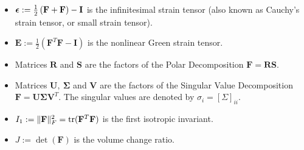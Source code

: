 \begin{itemize}
\item $\hbox{\boldmath $\epsilon$}:=\frac{1}{2}\left(\mathbf{F}+\mathbf{F}\right)-\mathbf{I}$ is
    the infinitesimal strain tensor (also known as Cauchy's strain tensor, or
    small strain tensor).
\item $\mathbf{E}:=\frac{1}{2}\left(\mathbf{F}^T\mathbf{F}-\mathbf{I}\right)$ is
  the nonlinear Green strain tensor.
\item Matrices $\mathbf{R}$ and $\mathbf{S}$ are the factors of the Polar
  Decomposition $\mathbf{F}=\mathbf{RS}$.
\item Matrices $\mathbf{U},\ \mathbf{\Sigma}$ and $\mathbf{V}$ are the factors
  of the Singular Value Decomposition $\mathbf{F}=\mathbf{U\Sigma
    V}^T$. The singular values are denoted by $\sigma_i=[\Sigma]_{ii}$.
\item $I_1:=\|\mathbf{F}\|_F^2=\mbox{tr}(\mathbf{F}^T\mathbf{F})$ is the first
  isotropic invariant.
\item $J:=\det(\mathbf{F})$ is the volume change ratio.
\end{itemize}

